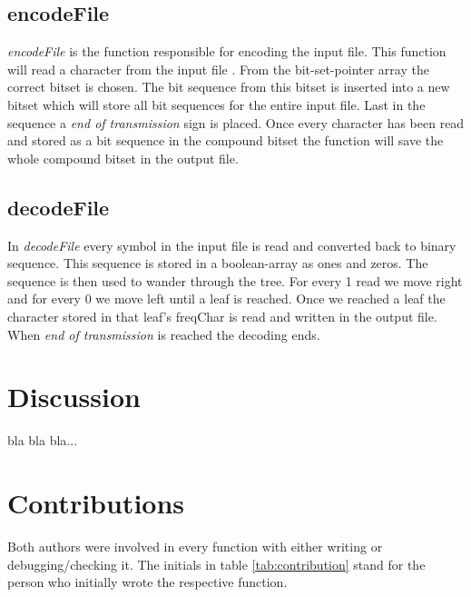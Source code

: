 \documentclass[a4paper,11pt,twoside]{article}
\begin{document}
\subsection{encodeFile}
\emph{encodeFile} is the function responsible for encoding the input file. This function will read a character from the input file . From the bit-set-pointer array the correct bitset is chosen. The bit sequence from this bitset is inserted into a new bitset which will store all bit sequences for the entire input file. Last in the sequence a \emph{end of transmission} sign is placed. Once every character has been read and stored as a bit sequence in the compound bitset the function will save the whole compound bitset in the output file.

\subsection{decodeFile}
In \emph{decodeFile} every symbol in the input file is read and converted back to binary sequence. This sequence is stored in a boolean-array as ones and zeros. The sequence is then used to wander through the tree. For every 1 read we move right and for every 0 we move left until a leaf is reached. Once we reached a leaf the character stored in that leaf's freqChar is read and written in the output file. When \emph{end of transmission} is reached the decoding ends.

\section{Discussion}
bla bla bla...

\section{Contributions}
Both authors were involved in every function with either writing or
debugging/checking it. The initials in table \ref{tab:contribution}
stand for the person who initially wrote the respective function.
\end{document}
